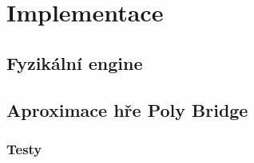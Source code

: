 \chapter{Implementace}

\section{Fyzikální engine}

\section{Aproximace hře Poly Bridge}
\subsection{Testy}

\section{}
